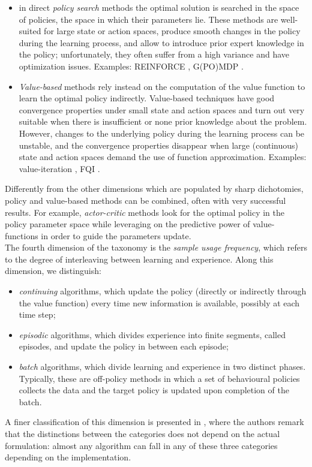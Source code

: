  \begin{itemize}
\item in direct \emph{policy search} methods the optimal solution is searched in the space of policies, \eg the space in which their parameters lie. These methods are well-suited for large state or action spaces,  produce smooth changes in the policy during the learning process, and allow to introduce prior expert knowledge in the policy; unfortunately, they often suffer from a high variance and have optimization issues. Examples: REINFORCE \cite{williams1992simple}, G(PO)MDP \cite{baxter2001infinite}.
\item \emph{Value-based} methods rely instead on the computation of the value function to learn the optimal policy indirectly. Value-based techniques have good convergence properties under small state and action spaces and turn out very suitable when there is insufficient or none prior knowledge about the problem. However, changes to the underlying policy during the learning process can be unstable, and the convergence properties disappear when large (\eg continuous) state and action spaces demand the use of function approximation. Examples: value-iteration \cite{sutton2018reinforcement}, FQI \cite{antos2008fitted}.
\end{itemize}

Differently from the other dimensions which are populated by sharp dichotomies, policy and value-based methods can be combined, often with very successful results. For example, \emph{actor-critic} methods \cite{grondman2012survey} look for the optimal policy in the policy parameter space while leveraging on the predictive power of value-functions in order to guide the parameters update. \\
The fourth dimension of the taxonomy is the \emph{sample usage frequency}, which refers to the degree of interleaving between learning and experience. Along this dimension, we distinguish:
 \begin{itemize}
\item \emph{continuing} algorithms, which update the policy (directly or indirectly through the value function) every time new information is available, possibly at each time step;
\item \emph{episodic} algorithms, which divides experience into finite segments, called episodes, and update the policy in between each episode;\item \emph{batch} algorithms, which divide learning and experience in two distinct phases. Typically, these are off-policy methods in which a set of behavioural policies collects the data and the target policy is updated upon completion of the batch.
\end{itemize}
A finer classification of this dimension is presented in \cite{lange2012batch}, where the authors remark that the distinctions between the categories does not depend on the actual formulation: almost any algorithm can fall in any of these three categories depending on the implementation.

